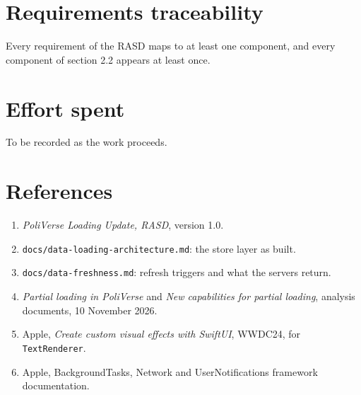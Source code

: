 \documentclass[dd]{se2doc}
\begin{document}
\maketitle





\section{Requirements traceability}
Every requirement of the RASD maps to at least one component, and every component of
section 2.2 appears at least once.
\printtraceability



\section{Effort spent}
To be recorded as the work proceeds.

\section{References}
\begin{enumerate}
  \item \emph{PoliVerse Loading Update, RASD}, version 1.0.
  \item \texttt{docs/data-loading-architecture.md}: the store layer as built.
  \item \texttt{docs/data-freshness.md}: refresh triggers and what the servers return.
  \item \emph{Partial loading in PoliVerse} and \emph{New capabilities for partial loading}, analysis documents, 10 November 2026.
  \item Apple, \emph{Create custom visual effects with SwiftUI}, WWDC24, for \texttt{TextRenderer}.
  \item Apple, BackgroundTasks, Network and UserNotifications framework documentation.
\end{enumerate}
\end{document}
